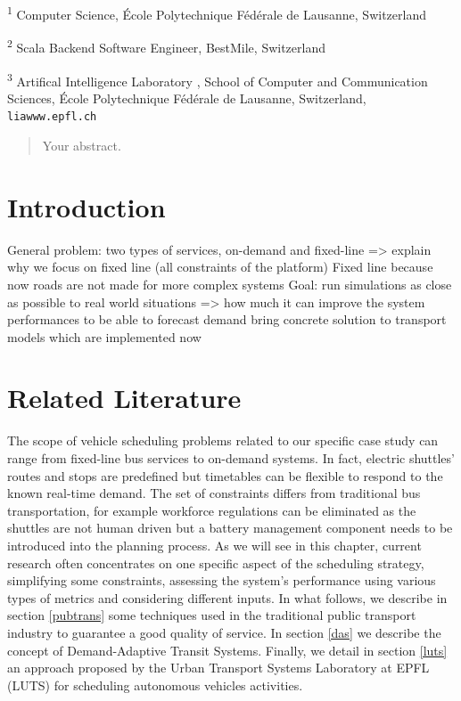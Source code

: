 \documentclass[12pt,a4paper]{article}
\begin{document}
\small \textsuperscript{1} Computer Science,  \'Ecole Polytechnique F\'ed\'erale de Lausanne, Switzerland

\small \textsuperscript{2} Scala Backend Software Engineer, BestMile, Switzerland 

\small \textsuperscript{3} Artifical Intelligence Laboratory , School of Computer and Communication Sciences, \'Ecole Polytechnique F\'ed\'erale de Lausanne, Switzerland, \verb+liawww.epfl.ch+ 




\newpage


\begin{abstract}
Your abstract.
\end{abstract}

\newpage

\tableofcontents
\newpage
\setlength{\parskip}{0.5em}
\section{Introduction}
General problem: two types of services, on-demand and fixed-line => explain why we focus on fixed line (all constraints of the platform) 
Fixed line because now roads are not made for more complex systems
Goal: run simulations as close as possible to real world situations
=> how much it can improve the system performances to be able to forecast demand
bring concrete solution to transport models which are implemented now
\section{Related Literature}\label{literature} 
The scope of vehicle scheduling problems related to our specific case study can range from fixed-line bus services to on-demand systems. In fact, electric shuttles' routes and stops are predefined but timetables can be flexible to respond to the known real-time demand. The set of constraints differs from traditional bus transportation, for example workforce regulations can be eliminated as the shuttles are not human driven but a battery management component needs to be introduced into the planning process. As we will see in this chapter, current research often concentrates on one specific aspect of the scheduling strategy, simplifying some constraints, assessing the system's performance using various types of metrics and considering different inputs. In what follows, we describe in section \ref{pubtrans} some techniques used in the traditional public transport industry to guarantee a good quality of service. In section \ref{das} we describe the concept of Demand-Adaptive Transit Systems. Finally, we detail in section \ref{luts} an approach proposed by the Urban Transport Systems Laboratory at EPFL (LUTS) for scheduling autonomous vehicles activities.  
\end{document}
